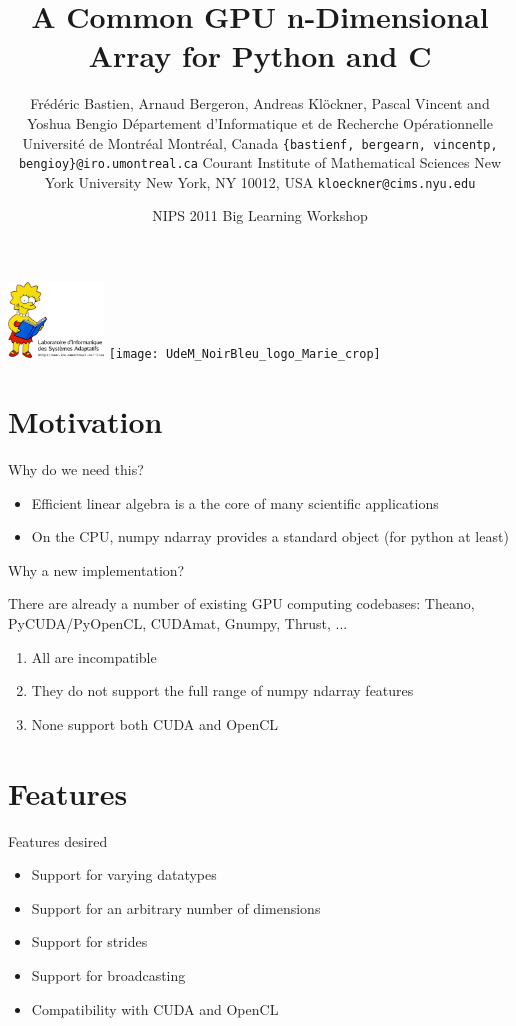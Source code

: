 \documentclass[utf8x,xcolor=pdftex,dvipsnames,table]{beamer}
\title{A Common GPU n-Dimensional Array for Python and C}
\author{
\footnotesize
Frédéric Bastien\superscript{a}, Arnaud Bergeron\superscript{a}, Andreas Klöckner\superscript{b}, \newline
Pascal Vincent\superscript{a} and Yoshua Bengio\superscript{a} \newline
\superscript{a}Département d'Informatique et de Recherche Opérationnelle \newline
Université de Montréal \newline
Montréal, Canada \newline
\texttt{\{bastienf, bergearn, vincentp, bengioy\}@iro.umontreal.ca} \newline
\superscript{b}Courant Institute of Mathematical Sciences \newline
New York University\newline
New York, NY 10012, USA\newline
\texttt{kloeckner@cims.nyu.edu}
}
\date{NIPS 2011 Big Learning Workshop}
\begin{document}
\begin{frame}[plain]
 \titlepage
 \vspace{-4em}
 \includegraphics[width=1in]{lisabook_logo_text_3.png}
 \hfill
 \texttt{[image: UdeM\_NoirBleu\_logo\_Marie\_crop]}
\end{frame}

\setcounter{page}{1}

\section{Motivation}

\begin{frame}{Why do we need this?}
\begin{itemize}
\item Efficient linear algebra is a the core of many scientific applications
\item On the CPU, numpy ndarray provides a standard object (for python at least)
\end{itemize}
\end{frame}

\begin{frame}{Why a new implementation?}
\begin{block}{There are already a number of existing GPU computing codebases:}
Theano, PyCUDA/PyOpenCL, CUDAmat, Gnumpy, Thrust, ...
\end {block}
\begin{enumerate}
\item<2-> All are incompatible
\item<3-> They do not support the full range of numpy ndarray features
\item<4-> None support both CUDA and OpenCL
\end{enumerate}
\end{frame}

\section{Features}
\begin{frame}{Features desired}
\begin{itemize}
\item Support for varying datatypes
\item Support for an arbitrary number of dimensions
\item Support for strides
\item Support for broadcasting
\item Compatibility with CUDA and OpenCL
\end{itemize}
\end{frame}
\end{document}
